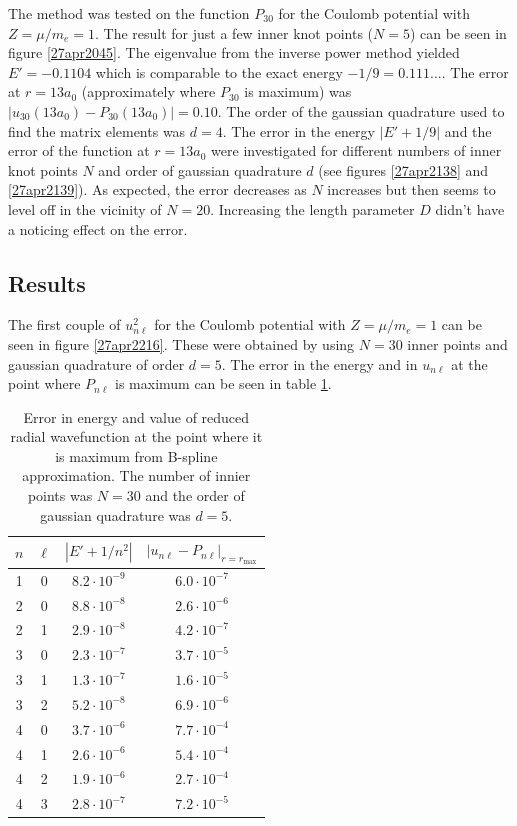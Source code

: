 \documentclass[twocolumn]{article}
\begin{document}
\begin{large}
The method was tested on the function $P_{30}$ for the Coulomb potential with $Z = \mu/m_e = 1$. The result for just a few inner knot points ($N=5$) can be seen in figure \ref{27apr2045}. The eigenvalue from the inverse power method yielded $E'=-0.1104$ which is comparable to the exact energy $-1/9 = 0.111...$. The error at $r=13a_0$ (approximately where $P_{30}$ is  maximum) was $|u_{30}(13a_0)-P_{30}(13a_0)| = 0.10$. The order of the gaussian quadrature used to find the matrix elements was $d=4$. The error in the energy $|E'+1/9|$ and the error of the function at $r=13a_0$ were investigated for different numbers of inner knot points $N$ and order of gaussian quadrature $d$ (see figures \ref{27apr2138} and \ref{27apr2139}). As expected, the error decreases as $N$ increases but then seems to level off in the vicinity of $N = 20$. Increasing the length parameter $D$ didn't have a noticing effect on the error.

\subsection*{Results}
The first couple of $u_{n\ell}^2$ for the Coulomb potential with $Z=\mu/m_e=1$ can be seen in figure \ref{27apr2216}. These were obtained by using $N=30$ inner points and gaussian quadrature of order $d=5$. The error in the energy and in $u_{n\ell}$ at the point where $P_{n\ell}$ is maximum can be seen in table \ref{28apr0826}. 
\begin{table}[!b]
\centering
    \begin{tabular}{c c c c}
        $n$ & $\ell$ & $|E'+1/n^2|$ & $|u_{n\ell}-P_{n\ell}|_{r=r_\text{max}}$ \\ 
        \hline\hline
        1 & 0 & $8.2\cdot 10^{-9}$ &$6.0\cdot 10^{-7}$ \\ 
        2 & 0 & $8.8\cdot 10^{-8}$ &$2.6\cdot 10^{-6}$ \\ 
        2 & 1 & $2.9\cdot 10^{-8}$ &$4.2\cdot 10^{-7}$ \\ 
        3 & 0 & $2.3\cdot 10^{-7}$ &$3.7\cdot 10^{-5}$ \\ 
        3 & 1 & $1.3\cdot 10^{-7}$ &$1.6\cdot 10^{-5}$ \\  
        3 & 2 & $5.2\cdot 10^{-8}$ &$6.9\cdot 10^{-6}$ \\ 
        4 & 0 & $3.7\cdot 10^{-6}$ &$7.7\cdot 10^{-4}$ \\ 
        4 & 1 & $2.6\cdot 10^{-6}$ &$5.4\cdot 10^{-4}$ \\ 
        4 & 2 & $1.9\cdot 10^{-6}$ &$2.7\cdot 10^{-4}$ \\ 
        4 & 3 & $2.8\cdot 10^{-7}$ &$7.2\cdot 10^{-5}$ 
    \end{tabular}
    \caption{Error in energy and value of reduced radial wavefunction at the point where it is maximum from B-spline approximation. The number of innier points was $N=30$ and the order of gaussian quadrature was $d=5$.}
    \label{28apr0826}
\end{table}


\end{large}
\end{document}
